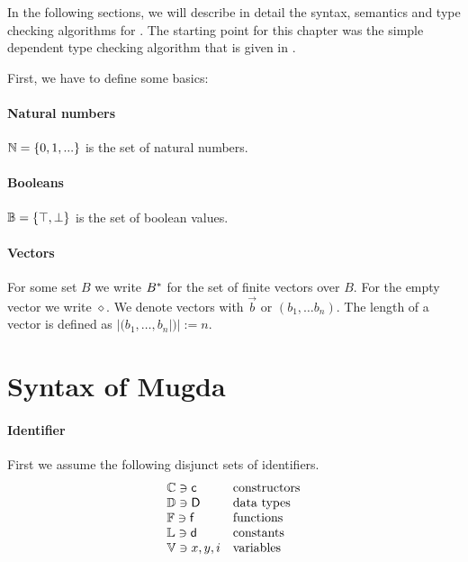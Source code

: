 In the following sections, we will describe in detail the syntax, semantics and type checking algorithms for \mugda.
The starting point for this chapter was the simple dependent type checking algorithm that is given in \cite{coquand96algorithm}.

\noindent First, we have to define some basics:
\paragraph*{Natural numbers}
$ \mathbb{N} = \{ 0 , 1 , ... \} $ is the set of natural numbers.
\paragraph*{Booleans}
$ \mathbb{B} = \{ \top, \bot \} $ is the set of boolean values.
\paragraph*{Vectors}
For some set $B$ we write ${B}^{\ast}$ for the set of finite vectors over $B$.
For the empty vector we write $\diamond$.
We denote vectors with $\vec{b}$ or $(b_1, \ldots b_n)$.
The length of a vector is defined as $|(b_1,\ldots, b_n|)| := n $. 
\section{Syntax of Mugda}

\paragraph*{Identifier}
First we assume the following disjunct sets of identifiers.
\[
\begin{array}{ll}
\mathbb{C} \ni \mathsf{c} & \mbox{constructors}\\
\mathbb{D} \ni \mathsf{D} & \mbox{data types}\\
\mathbb{F} \ni \mathsf{f} & \mbox{functions}\\
\mathbb{L} \ni \mathsf{d} & \mbox{constants}\\
\mathbb{V} \ni x,y,i & \mbox{variables}
\end{array}
\]


